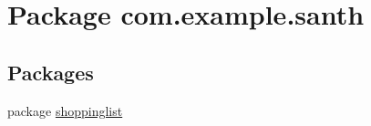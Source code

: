 \hypertarget{namespacecom_1_1example_1_1santh}{}\section{Package com.\+example.\+santh}
\label{namespacecom_1_1example_1_1santh}
\subsection*{Packages}
\begin{DoxyCompactItemize}
\item 
package \hyperlink{namespacecom_1_1example_1_1santh_1_1shoppinglist}{shoppinglist}
\end{DoxyCompactItemize}
